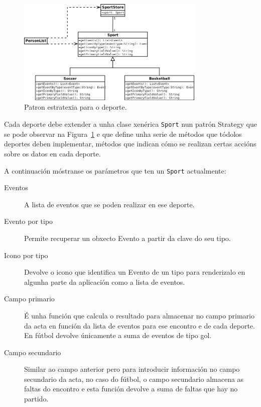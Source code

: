     \begin{figure}[h!]
      \begin{center}
      \includegraphics[width=0.8\textwidth]{./img/diagrams/sport_diagram.png}
      \caption{Patron estratexia para o deporte.}
      \label{fig:design:strategy}
      \end{center}
    \end{figure}

  Cada deporte debe extender a unha clase xenérica \lstinline{Sport} nun 
patrón Strategy\cite{book:patterns} que se pode observar na 
Figura~\ref{fig:design:strategy} e que define unha serie de métodos que tódolos 
deportes deben implementar, métodos que indican cómo se realizan certas accións 
sobre os datos en cada deporte.

  A continuación móstranse os parámetros que ten un \lstinline{Sport} 
actualmente:

  \begin{description}
   \item [Eventos] A lista de eventos que se poden realizar en ese deporte.
   \item [Evento por tipo] Permite recuperar un obxecto Evento a partir da 
clave do seu tipo.
   \item [Icono por tipo] Devolve o icono que identifica un Evento de un 
tipo para renderizalo en algunha parte da aplicación como a lista de eventos.
   \item [Campo primario] É unha función que calcula o resultado para 
almacenar no campo primario da acta en función da lista de eventos para ese 
encontro e de cada deporte. En fútbol devolve únicamente a suma de eventos de 
tipo gol.
   \item [Campo secundario] Similar ao campo anterior pero para introducir 
información no campo secundario da acta, no caso do fútbol, o campo secundario 
almacena as faltas do encontro e esta función devolve a suma de faltas que hay 
no partido.
  \end{description}

